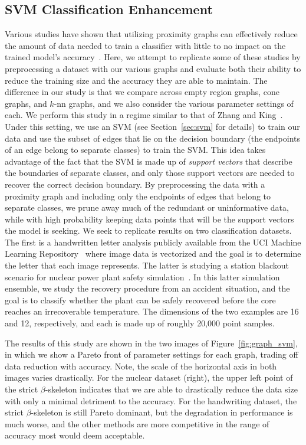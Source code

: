 \subsection{SVM Classification Enhancement}

Various studies have shown that utilizing proximity graphs can effectively reduce the amount of data needed to train a classifier with little to no impact on the trained model's accuracy~\cite{BhattacharyaPoulsenToussaint1981,GotoIshidaUchida2015,Toussaint2005,ToussaintBerzan2012,ZhangKing2002a,ZhangKing2002b}.
%
Here, we attempt to replicate some of these studies by preprocessing a dataset with our various graphs and evaluate both their ability to reduce the training size and the accuracy they are able to maintain.
%
The difference in our study is that we compare across empty region graphs, cone graphs, and $k$-nn graphs, and we also consider the various parameter settings of each.
%
We perform this study in a regime similar to that of Zhang and King~\cite{ZhangKing2002a,ZhangKing2002b}.
%
Under this setting, we use an SVM (see Section~\ref{sec:svm} for details) to train our data and use the subset of edges that lie on the decision boundary (the endpoints of an edge belong to separate classes) to train the SVM.
%
This idea takes advantage of the fact that the SVM is made up of \textit{support vectors} that describe the boundaries of separate classes, and only those support vectors are needed to recover the correct decision boundary.
%
By preprocessing the data with a proximity graph and including only the endpoints of edges that belong to separate classes, we prune away much of the redundant or uninformative data, while with high probability keeping data points that will be the support vectors the model is seeking.
%
We seek to replicate results on two classification datasets.
%
The first is a handwritten letter analysis publicly available from the UCI Machine Learning Repository~\cite{DuaGraff2017} where image data is vectorized and the goal is to determine the letter that each image represents.
%
The latter is studying a station blackout scenario for nuclear power plant safety simulation~\cite{MaljovecLiuWang2015}.
%
In this latter simulation ensemble, we study the recovery procedure from an accident situation, and the goal is to classify whether the plant can be safely recovered before the core reaches an irrecoverable temperature.
%
The dimensions of the two examples are 16 and 12, respectively, and each is made up of roughly 20,000 point samples.

The results of this study are shown in the two images of Figure~\ref{fig:graph_svm}, in which we show a Pareto front of parameter settings for each graph, trading off data reduction with accuracy.
%
Note, the scale of the horizontal axis in both images varies drastically.
%
For the nuclear dataset (right), the upper left point of the strict $\beta$-skeleton indicates that we are able to drastically reduce the data size with only a minimal detriment to the accuracy.
%
For the handwriting dataset, the strict $\beta$-skeleton is still Pareto dominant, but the degradation in performance is much worse, and the other methods are more competitive in the range of accuracy most would deem acceptable.

